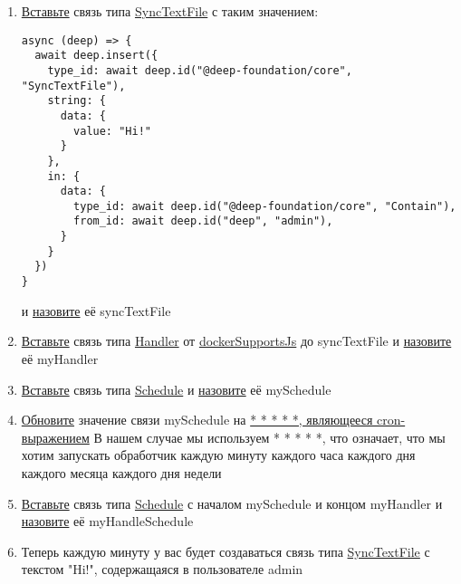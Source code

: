 \begin{enumerate}
  \item \hyperlink{DeepCase.InsertLink.Description}{Вставьте} связь типа
        \hyperlink{Core.SyncTextFile.Description}{SyncTextFile} с таким
        значением:
        \begin{lstlisting}
async (deep) => {
  await deep.insert({
    type_id: await deep.id("@deep-foundation/core", "SyncTextFile"),
    string: {
      data: {
        value: "Hi!"
      }
    },
    in: {
      data: {
        type_id: await deep.id("@deep-foundation/core", "Contain"),
        from_id: await deep.id("deep", "admin"),
      }
    }
  })
}
    \end{lstlisting}
        и \hyperlink{FAQ.HowToSetName}{назовите} её syncTextFile
  \item \hyperlink{DeepCase.InsertLink.Description}{Вставьте} связь типа
        \hyperlink{Core.Handler.Description}{Handler} от
        \hyperlink{Core.dockerSupportsJs.Description}{dockerSupportsJs}
        до syncTextFile и \hyperlink{FAQ.HowToSetName}{назовите} её
        myHandler
  \item \hyperlink{DeepCase.InsertLink.Description}{Вставьте} связь
        типа \hyperlink{Core.Schedule.Description}{Schedule} и
        \hyperlink{FAQ.HowToSetName}{назовите} её mySchedule
  \item \hyperlink{DeepCase.UpdateLink.Description}{Обновите}
        значение связи mySchedule на
        \hyperlink{Handler.Schedule.CronExpression.Description}{* * * * *,
          являющееся
          cron-выражением}
        В нашем случае мы используем * * * * *, что означает, что мы хотим
        запускать обработчик каждую минуту каждого часа каждого дня каждого
        месяца
        каждого дня недели
  \item \hyperlink{DeepCase.InsertLink.Description}{Вставьте} связь
        типа \hyperlink{Core.HandleSchedule.Description}{Schedule} с
        началом mySchedule
        и концом myHandler	и \hyperlink{FAQ.HowToSetName}{назовите} её
        myHandleSchedule
  \item Теперь каждую минуту у вас будет создаваться связь типа
        \hyperlink{Core.SyncTextFile.Description}{SyncTextFile} с текстом
        "Hi!",
        содержащаяся в пользователе admin
\end{enumerate}

